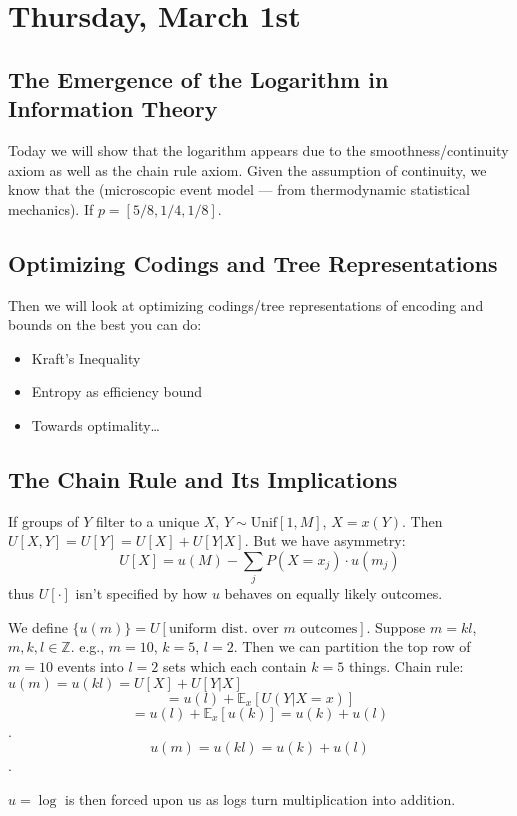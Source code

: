 \section{Thursday, March 1st}
\subsection{The Emergence of the Logarithm in Information Theory}

Today we will show that the logarithm appears due to the smoothness/continuity axiom as well as the chain rule axiom. Given the assumption of continuity, we know that the (microscopic event model — from thermodynamic statistical mechanics). If \( p=[5/8, 1/4, 1/8] \).

\subsection{Optimizing Codings and Tree Representations}

Then we will look at optimizing codings/tree representations of encoding and bounds on the best you can do:
\begin{itemize}
    \item Kraft's Inequality
    \item Entropy as efficiency bound
    \item Towards optimality…
\end{itemize}

\subsection{The Chain Rule and Its Implications}

If groups of \( Y \) filter to a unique \( X \), \( Y \sim \text{Unif}[1, M] \), \( X=x(Y) \). Then \( U[X, Y] = U[Y] = U[X] + U[Y | X] \). But we have asymmetry:
\[ U[X] = u(M) - \sum_j P(X = x_j) \cdot u(m_j) \]
thus \( U[\cdot] \) isn't specified by how \( u \) behaves on equally likely outcomes.

We define \( \{u(m)\} = U[\text{uniform dist. over } m \text{ outcomes}] \). Suppose \( m=kl \), \( m,k,l \in \mathbb{Z} \).
e.g., \( m=10 \), \( k=5 \), \( l=2 \). Then we can partition the top row of \( m=10 \) events into \( l=2 \) sets which each contain \( k=5 \) things. Chain rule: \( u(m) = u(kl) = U[X] + U[Y | X] \)
\[ = u(l) + \mathbb{E}_x [U(Y | X= x)] \]
\[ = u(l) + \mathbb{E}_x [u(k)] = u(k) + u(l) \].
\[ u(m) = u(kl) = u(k) + u(l) \].

\( u=\log \) is then forced upon us as logs turn multiplication into addition.

